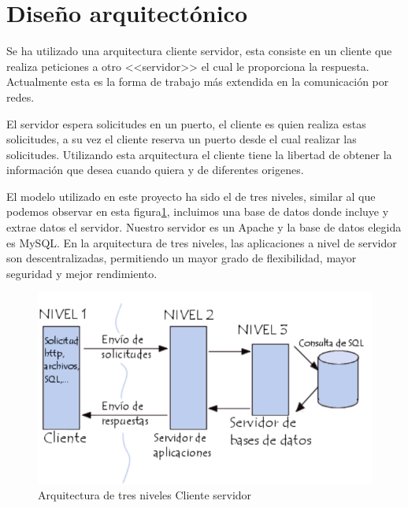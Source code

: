 \section{Diseño arquitectónico}
Se ha utilizado una arquitectura cliente servidor, esta consiste en un cliente que realiza peticiones a otro <<servidor>> el cual le proporciona la respuesta. Actualmente esta es la forma de trabajo más extendida en la comunicación por redes.

El servidor espera solicitudes en un puerto, el cliente es quien realiza estas solicitudes, a su vez el cliente reserva un puerto desde el cual realizar las solicitudes. Utilizando esta arquitectura el cliente tiene la libertad de obtener la información que desea cuando quiera y de diferentes origenes.\cite{cliente_servidor}

El modelo utilizado en este proyecto ha sido el de tres niveles, similar al que podemos observar en esta figura\ref{fig:CliSer}, incluimos una base de datos donde incluye y extrae datos el servidor. Nuestro servidor es un Apache y  la base de datos elegida es MySQL. En la arquitectura de tres niveles, las aplicaciones a nivel de servidor son descentralizadas, permitiendo un mayor grado de flexibilidad, mayor seguridad y mejor rendimiento.

\begin{figure}
\centering
\includegraphics[width=.9\textwidth]{img/cliente_servidor}
\caption{Arquitectura de tres niveles Cliente servidor}
\label{fig:CliSer}
\end{figure}




